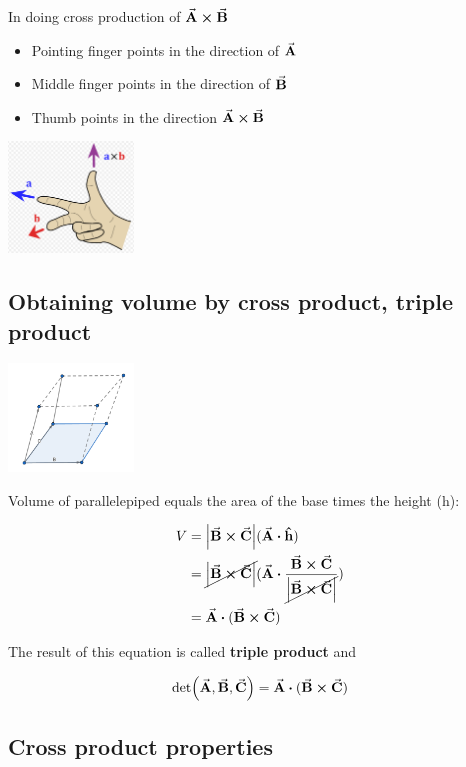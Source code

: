 \documentclass{article}
\begin{document}
    In doing cross production of $\va{A} \cross \va{B}$
    \begin{itemize}
        \item Pointing finger points in the direction of $\va{A}$
        \item Middle finger points in the direction of $\va{B}$
        \item Thumb points in the direction $\va{A} \cross \va{B}$
    \end{itemize}

    \includegraphics[width=0.25\textwidth]{fig_6.png}

    \subsection{Obtaining volume by cross product, triple product}

    \includegraphics[width=0.25\textwidth]{fig_7.png}

    Volume of parallelepiped equals the area of the base times the height (h):

    \begin{align}
        V & =\abs{\va{B} \cross \va{C}}(\va{A}\vdot\vu{h})\\
        & =\cancel{\abs{\va{B} \cross \va{C}}}
        (\va{A}\vdot\frac{\va{B} \cross \va{C}}{\cancel{\abs{\va{B} \cross \va{C}}}})\\
        & =\va{A}\vdot(\va{B} \cross \va{C})
    \end{align}

    The result of this equation is called \textbf{triple product} and

    \begin{align}
        \det(\va{A}, \va{B}, \va{C})=\va{A}\vdot(\va{B} \cross \va{C})
    \end{align}

    \subsection{Cross product properties}
\end{document}
